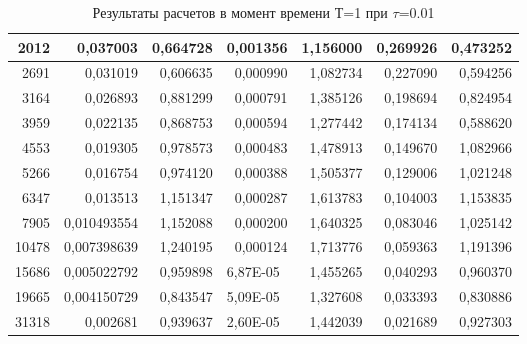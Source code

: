 \documentclass[14pt]{article}
\begin{document}
\begin{table}[!h!]
\begin{tabular}{|r|r|r|r|r|r|r|}
2012                    & 0,037003                         & 0,664728                  & 0,001356                      & 1,156000                  & 0,269926                    & 0,473252                    \\ \hline
2691                    & 0,031019                         & 0,606635                  & 0,000990                      & 1,082734                  & 0,227090                    & 0,594256                    \\ \hline
3164                    & 0,026893                         & 0,881299                  & 0,000791                      & 1,385126                  & 0,198694                    & 0,824954                    \\ \hline
3959                    & 0,022135                         & 0,868753                  & 0,000594                      & 1,277442                  & 0,174134                    & 0,588620                    \\ \hline
4553                    & 0,019305    & 0,978573                  & 0,000483                      & 1,478913                  & 0,149670                    & 1,082966                    \\ \hline
5266                    & 0,016754                         & 0,974120                  & 0,000388                      & 1,505377                  & 0,129006                    & 1,021248                    \\ \hline
6347                    & 0,013513                         & 1,151347                  & 0,000287                      & 1,613783                  & 0,104003                    & 1,153835                    \\ \hline
7905                    & 0,010493554 & 1,152088                  & 0,000200                      & 1,640325                  & 0,083046                    & 1,025142                    \\ \hline
10478                   & \multicolumn{1}{l|}{0,007398639} & 1,240195                  & 0,000124                      & 1,713776                  & 0,059363                    & 1,191396                    \\ \hline
15686                   & \multicolumn{1}{l|}{0,005022792} & 0,959898                  & \multicolumn{1}{l|}{6,87E-05} & 1,455265                  & 0,040293                    & 0,960370                    \\ \hline
19665                   & \multicolumn{1}{l|}{0,004150729} & 0,843547                  & \multicolumn{1}{l|}{5,09E-05} & 1,327608                  & 0,033393                    & 0,830886                    \\ \hline
31318                   & 0,002681                         & 0,939637                  & \multicolumn{1}{l|}{2,60E-05} & 1,442039                  & 0,021689                    & 0,927303                    \\ \hline
\end{tabular}
\caption{Результаты расчетов в момент времени Т=1 при $\tau$=0.01}
\end{table}
\end{document}
